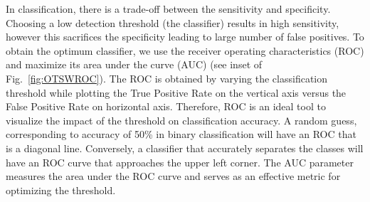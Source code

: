\documentclass[aps,pra,preprint,superscriptaddress]{revtex4-1}
\begin{document}
In classification, there is a trade-off between the sensitivity and specificity. Choosing a low detection threshold (the classifier) results in high sensitivity, however this sacrifices the specificity leading to large number of false positives. To obtain the optimum classifier, we use the receiver operating characteristics (ROC) and maximize its area under the curve (AUC) (see inset of Fig.~\ref{fig:OTSWROC}). The ROC is obtained by varying the classification threshold while plotting the True Positive Rate on the vertical axis versus the False Positive Rate on horizontal axis. Therefore, ROC is an ideal tool to visualize the impact of the threshold on classification accuracy. A random guess, corresponding to accuracy of 50\% in binary classification will have an ROC that is a diagonal line. Conversely, a classifier that accurately separates the classes will have an ROC curve that approaches the upper left corner. The AUC parameter measures the area under the ROC curve and serves as an effective metric for optimizing the threshold.
\end{document}
